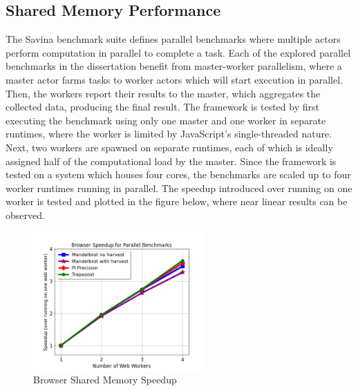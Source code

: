 \documentclass[lettersize,journal]{IEEEtran}
\begin{document}
\subsection{Shared Memory Performance}
The Savina benchmark suite defines parallel benchmarks where multiple actors perform computation in parallel to complete a task. Each of the explored parallel benchmarks in the dissertation benefit from master-worker parallelism, where a master actor farms tasks to worker actors which will start execution in parallel. Then, the workers report their results to the master, which aggregates the collected data, producing the final result. The framework is tested by first executing the benchmark using only one master and one worker in separate runtimes, where the worker is limited by JavaScript's single-threaded nature.  Next, two workers are spawned on separate runtimes, each of which is ideally assigned half of the computational load by the master. Since the framework is tested on a system which houses four cores, the benchmarks are scaled up to four worker runtimes running in parallel. The speedup introduced over running on one worker is tested and plotted in the figure below, where near linear results can be observed.
\begin{figure}[H]
    \begin{centering}
        \includegraphics[width=250px]{resources/browser_speedup.png}
        \caption{Browser Shared Memory Speedup}
    \end{centering}
\end{figure}
\end{document}
